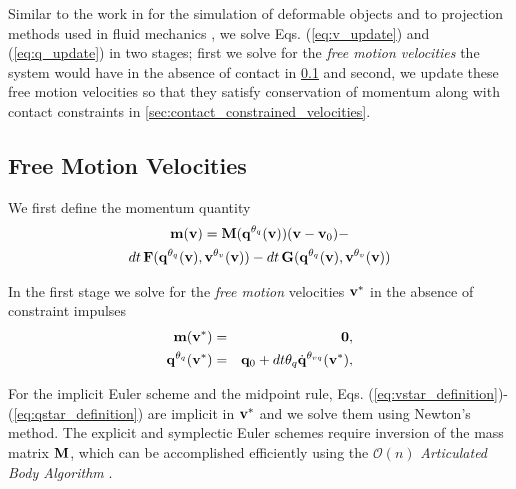 Similar to the work in \cite{bib:duriez2005realistic} for the simulation of
deformable objects and to projection methods used in fluid mechanics
\cite{bib::bell1991efficient}, we solve Eqs. (\ref{eq:v_update}) and
(\ref{eq:q_update}) in two stages; first we solve for the \emph{free motion
velocities} the system would have in the absence of contact in
\ref{sec:free_motion_velocities} and second, we update these free motion
velocities so that they satisfy conservation of momentum along with contact
constraints in \ref{sec:contact_constrained_velocities}.

\subsection{Free Motion Velocities}
\label{sec:free_motion_velocities}
We first define the momentum quantity
\begin{multline}
	\mf{m}(\mf{v}) =
	\mf{M}(\mf{q}^{\theta_{q}}(\mf{v}))(\mf{v}-\mf{v}_0) -\\
	dt\,\mf{F}(\mf{q}^{\theta_{q}}(\mf{v}), \mf{v}^{\theta_v}(\mf{v}))-
	dt\,\mf{G}(\mf{q}^{\theta_{q}}(\mf{v}), \mf{v}^{\theta_v}(\mf{v}))
	\label{eq:m_definition}
\end{multline}

In the first stage we solve for the
\textit{free motion} velocities ${\mathbf{v}}^*$ in the absence of constraint impulses
\begin{eqnarray}
	\mf{m}(\mf{v}^*) &=& \mf{0},
	\label{eq:vstar_definition}\\
	\mf{q}^{\theta_q}(\mf{v}^*) &=& \mf{q}_0 + dt\theta_q\dot{\mf{q}}^{\theta_{vq}}(\mf{v}^*),
	\label{eq:qstar_definition}
\end{eqnarray}

For the implicit Euler scheme and the midpoint rule, Eqs.
(\ref{eq:vstar_definition})-(\ref{eq:qstar_definition}) are implicit in
${\mathbf{v}}^*$ and we solve them using Newton's method. The explicit and symplectic
Euler schemes require inversion of the mass matrix ${\mathbf{M}}$, which can be
accomplished efficiently using the $\mathcal{O}(n)$
\emph{Articulated Body Algorithm}
\cite{bib:featherstone2008_rigid_body_dynamics_algorithms}.

